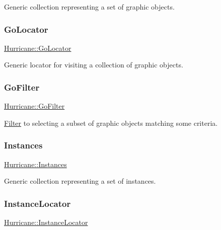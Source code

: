 Generic collection representing a set of graphic objects. \mbox{\label{namespaceHurricane_ab7d66a25194b15d7646c93bcc1b15fc8}} 
\subsubsection{\texorpdfstring{Go\+Locator}{GoLocator}}
{\footnotesize\ttfamily \mbox{\hyperlink{namespaceHurricane_ab7d66a25194b15d7646c93bcc1b15fc8}{Hurricane\+::\+Go\+Locator}}}

Generic locator for visiting a collection of graphic objects. \mbox{\label{namespaceHurricane_a372aada7b76742fd900d0bb2c5398e0c}} 
\subsubsection{\texorpdfstring{Go\+Filter}{GoFilter}}
{\footnotesize\ttfamily \mbox{\hyperlink{namespaceHurricane_a372aada7b76742fd900d0bb2c5398e0c}{Hurricane\+::\+Go\+Filter}}}

\mbox{\hyperlink{classHurricane_1_1Filter}{Filter}} to selecting a subset of graphic objects matching some criteria. \mbox{\label{namespaceHurricane_ac9436b03a2926f34ad6863deae2baadc}} 
\subsubsection{\texorpdfstring{Instances}{Instances}}
{\footnotesize\ttfamily \mbox{\hyperlink{namespaceHurricane_ac9436b03a2926f34ad6863deae2baadc}{Hurricane\+::\+Instances}}}

Generic collection representing a set of instances. \mbox{\label{namespaceHurricane_af4f7fa4dc3a2d3bdcec6f375dc5a21bc}} 
\subsubsection{\texorpdfstring{Instance\+Locator}{InstanceLocator}}
{\footnotesize\ttfamily \mbox{\hyperlink{namespaceHurricane_af4f7fa4dc3a2d3bdcec6f375dc5a21bc}{Hurricane\+::\+Instance\+Locator}}}

